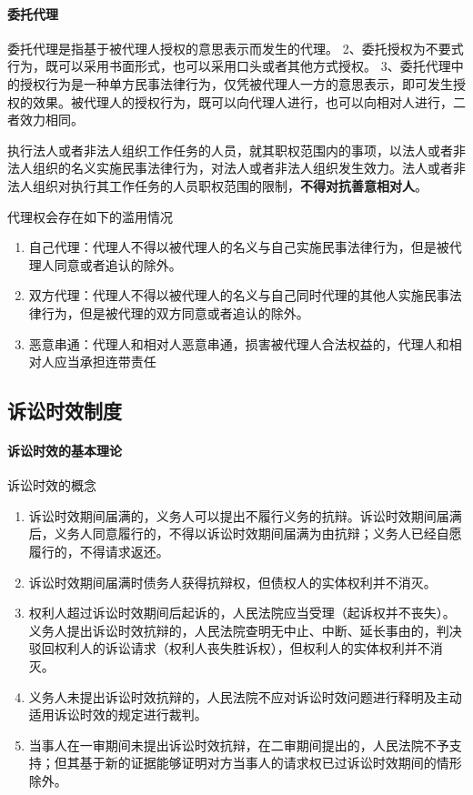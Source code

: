\documentclass[UTF8,12pt]{ctexart}
\numberwithin{equation}{section} %
\numberwithin{figure}{section}
\numberwithin{table}{section}
\begin{document}
	
	\paragraph{委托代理}
	委托代理是指基于被代理人授权的意思表示而发生的代理。
	2、委托授权为不要式行为，既可以采用书面形式，也可以采用口头或者其他方式授权。
	3、委托代理中的授权行为是一种单方民事法律行为，仅凭被代理人一方的意思表示，即可发生授权的效果。被代理人的授权行为，既可以向代理人进行，也可以向相对人进行，二者效力相同。
	
	执行法人或者非法人组织工作任务的人员，就其职权范围内的事项，以法人或者非法人组织的名义实施民事法律行为，对法人或者非法人组织发生效力。法人或者非法人组织对执行其工作任务的人员职权范围的限制，\textbf{不得对抗善意相对人}。
	
	代理权会存在如下的滥用情况
	\begin{enumerate}
		\item 自己代理：代理人不得以被代理人的名义与自己实施民事法律行为，但是被代理人同意或者追认的除外。
		
		\item 双方代理：代理人不得以被代理人的名义与自己同时代理的其他人实施民事法律行为，但是被代理的双方同意或者追认的除外。
		
		\item 恶意串通：代理人和相对人恶意串通，损害被代理人合法权益的，代理人和相对人应当承担连带责任
	\end{enumerate}
	
	\subsection{诉讼时效制度}
	
	\paragraph{诉讼时效的基本理论}
	诉讼时效的概念
	\begin{enumerate}
		\item 诉讼时效期间届满的，义务人可以提出不履行义务的抗辩。诉讼时效期间届满后，义务人同意履行的，不得以诉讼时效期间届满为由抗辩；义务人已经自愿履行的，不得请求返还。
		
		\item 诉讼时效期间届满时债务人获得抗辩权，但债权人的实体权利并不消灭。
		
		\item 权利人超过诉讼时效期间后起诉的，人民法院应当受理（起诉权并不丧失）。义务人提出诉讼时效抗辩的，人民法院查明无中止、中断、延长事由的，判决驳回权利人的诉讼请求（权利人丧失胜诉权），但权利人的实体权利并不消灭。
		
		\item 义务人未提出诉讼时效抗辩的，人民法院不应对诉讼时效问题进行释明及主动适用诉讼时效的规定进行裁判。
		
		\item 当事人在一审期间未提出诉讼时效抗辩，在二审期间提出的，人民法院不予支持；但其基于新的证据能够证明对方当事人的请求权已过诉讼时效期间的情形除外。
		
	\end{enumerate}
	
\end{document}
